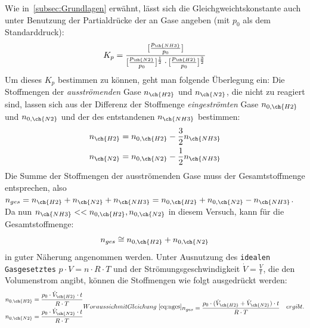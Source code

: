 \documentclass{scrartcl}
\begin{document}
Wie in~\ref{subsec:Grundlagen} erwähnt, lässt sich die Gleichgweichtskonstante auch unter Benutzung der Partialdrücke der an Gase angeben (mit $p_0$ als dem Standarddruck):
\begin{equation} \label{eq:Kp}
	K_p = \frac{[\frac{p_{\ch{NH3}}}{p_0}]}{[\frac{p_{\ch{N2}}}{p_0}]^{\frac{1}{2}}\cdot[\frac{p_{\ch{H2}}}{p_0}]^{\frac{3}{2}}}
\end{equation}
Um dieses $K_p$ bestimmen zu können, geht man folgende Überlegung ein: Die Stoffmengen der \emph{ausströmenden} Gase $n_{\ch{H2}}$ und $n_{\ch{N2}}$, die nicht zu  reagiert sind, lassen sich aus der Differenz der Stoffmenge \emph{eingeströmten} Gase $n_{0,\ch{H2}}$ und $n_{0,\ch{N2}}$ und der des entstandenen $n_{\ch{NH3}}$ bestimmen:
\begin{subequations}
	\begin{align}
		n_{\ch{H2}}=n_{0,\ch{H2}}-\frac{3}{2}n_{\ch{NH3}} \label{eq:nH2} \\
		n_{\ch{N2}}=n_{0,\ch{N2}}-\frac{1}{2}n_{\ch{NH3}} \label{eq:nN2} 
	\end{align}
\end{subequations}
Die Summe der Stoffmengen der ausströmenden Gase muss der Gesamtstoffmenge entsprechen, also $n_{ges} = n_{\ch{H2}} + n_{\ch{N2}} + n_{\ch{NH3}} = n_{0,\ch{H2}} + n_{0,\ch{N2}} - n_{\ch{NH3}}$. \\
Da nun $n_{\ch{NH3}}<<n_{0,\ch{H2}},n_{0,\ch{N2}}$ in diesem Versuch, kann für die Gesamtstoffmenge:
\begin{equation} \label{eq:nges}
	n_{ges} \cong n_{0,\ch{H2}} + n_{0,\ch{N2}} 
\end{equation}
in guter Näherung angenommen werden. Unter Ausnutzung des \texttt{idealen Gasgesetztes} $p\cdot V = n\cdot R\cdot T$ und der Strömungsgeschwindigkeit $\dot{V}=\frac{V}{t}$, die den Volumenstrom angibt, können die Stoffmengen wie folgt ausgedrückt werden:
\begin{subequations}
	\begin{align}
		n_{0,\ch{H2}} &= \frac{p_0\cdot \dot{V}_{\ch{H2}}\cdot t}{R\cdot T} \\
		n_{0,\ch{N2}} &= \frac{p_0\cdot \dot{V}_{\ch{N2}}\cdot t}{R\cdot T}
	\end{align}
	Woraus sich mit Gleichung~\ref{eq:nges}
	\begin{align}
		n_{ges} &= \frac{p_0\cdot(\dot{V}_{\ch{H2}}+\dot{V}_{\ch{N2}})\cdot t}{R\cdot T} \label{eq:nges2}
	\end{align}
		ergibt.
\end{subequations}
\end{document}
